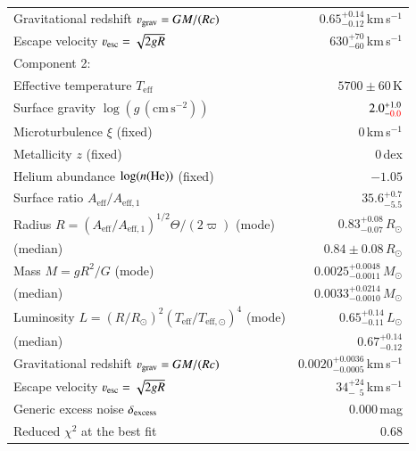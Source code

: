 \documentclass{standalone}
\begin{document}
\begin{tabular}{lr}
Gravitational redshift $\varv_\mathrm{grav} = GM/(Rc)$ & $0.65^{+0.14}_{-0.12}$\,km\,s${}^{-1}$ \\
Escape velocity $\varv_\mathrm{esc} = \sqrt{2gR}$ & $630^{+70}_{-60}$\,km\,s${}^{-1}$ \\
\hline
\multicolumn{2}{l}{Component 2:} \\
Effective temperature $T_{\mathrm{eff}}$ & $5700 \pm 60$\,K \\
Surface gravity $\log (g\,\mathrm{(cm\,s^{-2})})$ & $2.0^{+1.0}_{-{\color{red}0.0}}$ \\
Microturbulence $\xi$ (fixed) & $0$\,km\,s$^{-1}$ \\
Metallicity $z$ (fixed) & $0$\,dex \\
Helium abundance $\log(n(\textnormal{He}))$ (fixed) & $-1.05$ \\
Surface ratio $A_\mathrm{eff}/A_{\mathrm{eff,}1}$ & $35.6^{+0.7}_{-5.5}$ \\
Radius $R = (A_\mathrm{eff}/A_{\mathrm{eff,}1})^{1/2}\Theta/(2\varpi)$ (mode) & $0.83^{+0.08}_{-0.07}$\,$R_\odot$ \\
\phantom{Radius $R = (A_\mathrm{eff}/A_{\mathrm{eff,}1})^{1/2}\Theta/(2\varpi)$ }(median) & $0.84 \pm 0.08$\,$R_\odot$ \\
Mass $M = g R^2/G$ (mode) & $0.0025^{+0.0048}_{-0.0011}$\,$M_\odot$ \\
\phantom{Mass $M = g R^2/G$ }(median) & $0.0033^{+0.0214}_{-0.0010}$\,$M_\odot$ \\
Luminosity $L = (R/R_\odot)^2(T_\mathrm{eff}/T_{\mathrm{eff},\odot})^4$ (mode) & $0.65^{+0.14}_{-0.11}$\,$L_\odot$ \\
\phantom{Luminosity $L/L_\odot = (R/R_\odot)^2(T_\mathrm{eff}/T_{\mathrm{eff},\odot})^4$ }(median) & $0.67^{+0.14}_{-0.12}$ \\
Gravitational redshift $\varv_\mathrm{grav} = GM/(Rc)$ & $0.0020^{+0.0036}_{-0.0005}$\,km\,s${}^{-1}$ \\
Escape velocity $\varv_\mathrm{esc} = \sqrt{2gR}$ & $34^{+24}_{-\phantom{0}5}$\,km\,s${}^{-1}$ \\
\hline
Generic excess noise $\delta_\textnormal{excess}$ & $0.000$\,mag \\
Reduced $\chi^2$ at the best fit & $0.68$ \\
\hline
\end{tabular}
\end{document}
